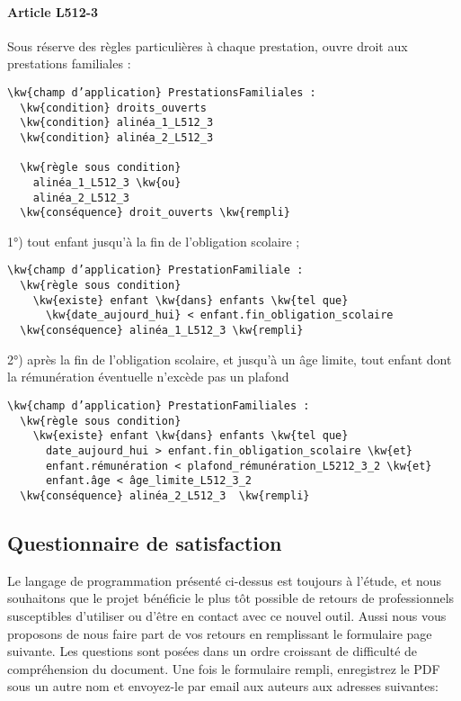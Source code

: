 \documentclass[12pt, french]{article}
\newcommand{\kw}[1]{\textbf{\textcolor{OliveGreen}{#1}}}
\begin{document}
\paragraph{Article L512-3} Sous réserve des règles particulières à chaque prestation, ouvre droit aux prestations familiales :

\begin{Verbatim}[commandchars=\\\{\}]
\kw{champ d’application} PrestationsFamiliales :
  \kw{condition} droits_ouverts
  \kw{condition} alinéa_1_L512_3
  \kw{condition} alinéa_2_L512_3

  \kw{règle sous condition}
    alinéa_1_L512_3 \kw{ou}
    alinéa_2_L512_3
  \kw{conséquence} droit_ouverts \kw{rempli}
\end{Verbatim}

1°) tout enfant jusqu’à la fin de l’obligation scolaire ;

\begin{Verbatim}[commandchars=\\\{\}]
\kw{champ d’application} PrestationFamiliale :
  \kw{règle sous condition}
    \kw{existe} enfant \kw{dans} enfants \kw{tel que}
      \kw{date_aujourd_hui} < enfant.fin_obligation_scolaire
  \kw{conséquence} alinéa_1_L512_3 \kw{rempli}
\end{Verbatim}

2°) après la fin de l’obligation scolaire, et jusqu’à un âge limite, tout enfant dont la rémunération éventuelle n’excède pas un plafond

\begin{Verbatim}[commandchars=\\\{\}]
\kw{champ d’application} PrestationFamiliales :
  \kw{règle sous condition}
    \kw{existe} enfant \kw{dans} enfants \kw{tel que}
      date_aujourd_hui > enfant.fin_obligation_scolaire \kw{et}
      enfant.rémunération < plafond_rémunération_L5212_3_2 \kw{et}
      enfant.âge < âge_limite_L512_3_2
  \kw{conséquence} alinéa_2_L512_3  \kw{rempli}
\end{Verbatim}

\subsection{Questionnaire de satisfaction}

Le langage de programmation présenté ci-dessus est toujours à l'étude, et nous souhaitons que le projet bénéficie le plus tôt possible de retours de professionnels susceptibles d'utiliser ou d'être en contact avec ce nouvel outil. Aussi nous vous proposons de nous faire part de vos retours en remplissant le formulaire page suivante. Les questions sont posées dans un ordre croissant de difficulté de compréhension du document. Une fois le formulaire rempli, enregistrez le PDF sous un autre nom et envoyez-le par email aux auteurs aux adresses suivantes:
\end{document}
